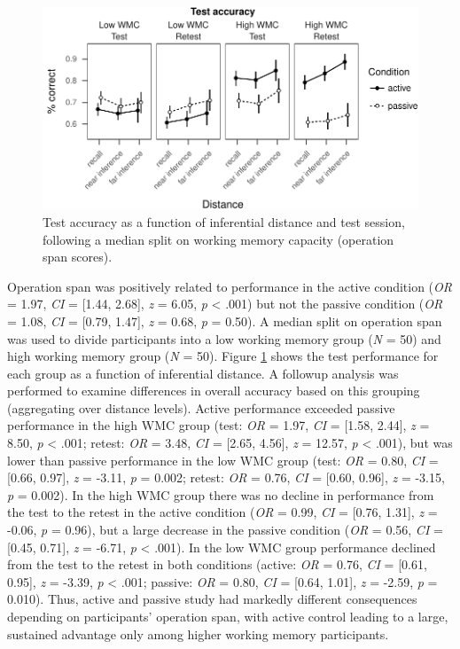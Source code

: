 \documentclass[floatsintext,man]{apa6}
\theoremstyle{definition}
\theoremstyle{definition}
\theoremstyle{definition}
\theoremstyle{remark}
\begin{document}
\begin{figure}
\centering
\includegraphics{active_transitive_inference_files/figure-latex/unnamed-chunk-3-1.pdf}
\caption{\label{fig:unnamed-chunk-3}Test accuracy as a function of
inferential distance and test session, following a median split on
working memory capacity (operation span scores). \label{fig_acc}}
\end{figure}

Operation span was positively related to performance in the active
condition (\emph{OR} = 1.97, \emph{CI} = {[}1.44, 2.68{]}, \emph{z} =
6.05, \emph{p} \textless{} .001) but not the passive condition
(\emph{OR} = 1.08, \emph{CI} = {[}0.79, 1.47{]}, \emph{z} = 0.68,
\emph{p} = 0.50). A median split on operation span was used to divide
participants into a low working memory group (\emph{N} = 50) and high
working memory group (\emph{N} = 50). Figure \ref{fig_acc} shows the
test performance for each group as a function of inferential distance. A
followup analysis was performed to examine differences in overall
accuracy based on this grouping (aggregating over distance levels).
Active performance exceeded passive performance in the high WMC group
(test: \emph{OR} = 1.97, \emph{CI} = {[}1.58, 2.44{]}, \emph{z} = 8.50,
\emph{p} \textless{} .001; retest: \emph{OR} = 3.48, \emph{CI} =
{[}2.65, 4.56{]}, \emph{z} = 12.57, \emph{p} \textless{} .001), but was
lower than passive performance in the low WMC group (test: \emph{OR} =
0.80, \emph{CI} = {[}0.66, 0.97{]}, \emph{z} = -3.11, \emph{p} = 0.002;
retest: \emph{OR} = 0.76, \emph{CI} = {[}0.60, 0.96{]}, \emph{z} =
-3.15, \emph{p} = 0.002). In the high WMC group there was no decline in
performance from the test to the retest in the active condition
(\emph{OR} = 0.99, \emph{CI} = {[}0.76, 1.31{]}, \emph{z} = -0.06,
\emph{p} = 0.96), but a large decrease in the passive condition
(\emph{OR} = 0.56, \emph{CI} = {[}0.45, 0.71{]}, \emph{z} = -6.71,
\emph{p} \textless{} .001). In the low WMC group performance declined
from the test to the retest in both conditions (active: \emph{OR} =
0.76, \emph{CI} = {[}0.61, 0.95{]}, \emph{z} = -3.39, \emph{p}
\textless{} .001; passive: \emph{OR} = 0.80, \emph{CI} = {[}0.64,
1.01{]}, \emph{z} = -2.59, \emph{p} = 0.010). Thus, active and passive
study had markedly different consequences depending on participants'
operation span, with active control leading to a large, sustained
advantage only among higher working memory participants.
\end{document}
